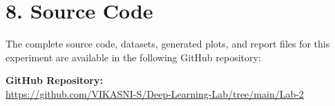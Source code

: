 \documentclass[11pt]{article}
\begin{document}



\section*{8. Source Code}


The complete source code, datasets, generated plots, and report files for this experiment are available in the following GitHub repository:



\noindent\textbf{GitHub Repository:} \\
\url{https://github.com/VIKASNI-S/Deep-Learning-Lab/tree/main/Lab-2}\\
\end{document}
